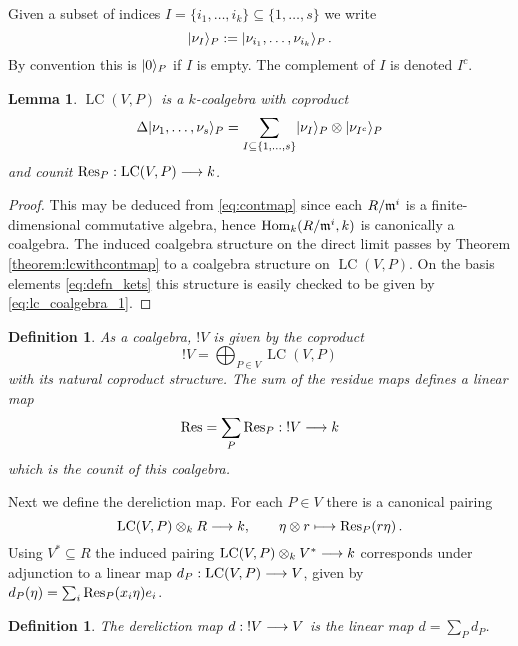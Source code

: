 \documentclass[english,letter paper,12pt,reqno]{article}
\DeclarePairedDelimiter\ket{\lvert}{\rangle}
\newtheorem{lemma}[theorem]{Lemma}
\theoremstyle{example}
\newtheorem{definition}[theorem]{Definition}
\numberwithin{equation}{section}
\def\Hom{\operatorname{Hom}}
\DeclareMathOperator{\LC}{LC}
\begin{document}
Given a subset of indices $I =  \{ i_1, \ldots, i_k \} \subseteq \{ 1, \ldots, s \}$ we write
\[
\ket{ \nu_I }_P := \ket{ \nu_{i_1}, \ldots, \nu_{i_k} }_P\,.
\]
By convention this is $\ket{0}_P$ if $I$ is empty. The complement of $I$ is denoted $I^c$.

\begin{lemma}\label{lemma:lc_coalgebra} $\LC(V,P)$ is a $k$-coalgebra with coproduct
\begin{equation}\label{eq:lc_coalgebra_1}
\Delta \ket{ \nu_1, \ldots, \nu_s }_P = \sum_{I \subseteq \{ 1, \ldots, s \}} \ket{ \nu_I }_P \otimes \ket{ \nu_{I^c} }_P
\end{equation}
and counit $\Res_P: \LC(V,P) \lto k$.
\end{lemma}
\begin{proof}
This may be deduced from \eqref{eq:contmap} since each $R/\mathfrak{m}^i$ is a finite-dimensional commutative algebra, hence $\Hom_k( R/\mf{m}^i, k )$ is canonically a coalgebra. The induced coalgebra structure on the direct limit passes by Theorem \ref{theorem:lcwithcontmap} to a coalgebra structure on $\LC(V,P)$. On the basis elements \eqref{eq:defn_kets} this structure is easily checked to be given by \eqref{eq:lc_coalgebra_1}.
\end{proof}

\begin{definition}\label{definition:bang} As a coalgebra, $!V$ is given by the coproduct
\begin{equation}
!V = \bigoplus_{P \in V} \LC(V,P)
\end{equation}
with its natural coproduct structure. The sum of the residue maps defines a linear map
\begin{equation}\label{eq:residue_der}
\operatorname{Res}\!\, = \sum_P \operatorname{Res}\!_P: {!}V \longrightarrow k
\end{equation}
which is the counit of this coalgebra.
\end{definition}

Next we define the dereliction map. For each $P \in V$ there is a canonical pairing
\[
\LC(V,P) \otimes_k R \lto k, \qquad \eta \otimes r \longmapsto \Res_P(r \eta)\,.
\]
Using $V^* \subseteq R$ the induced pairing $\LC(V,P) \otimes_k V^* \lto k$ corresponds under adjunction to a linear map $d_P: \LC(V,P) \lto V$, given by $d_P( \eta ) = \sum_i \operatorname{Res}\!_P( x_i \eta ) e_i$.

\begin{definition} The \emph{dereliction} map $d: {!}V \longrightarrow V$ is the linear map $d = \sum_P d_P$.
\end{definition}
\end{document}
